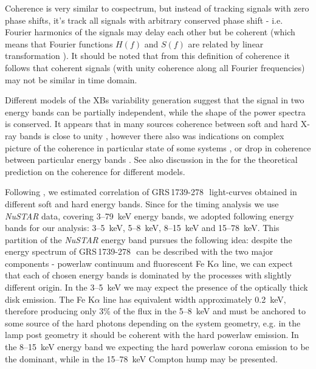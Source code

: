\documentclass[a4paper,fleqn,usenatbib]{mnras}
\def\grs{{GRS\,1739-278\,}}
\begin{document}
Coherence is very similar to cospectrum, but instead of tracking signals with zero phase shifts, it's track all signals with arbitrary conserved phase shift - i.e. Fourier harmonics of the signals may delay each other but be coherent (which means that Fourier functions $H(f)$ and $S(f)$ are related by linear transformation \citep{1997ApJ...474L..43V}).
It should be noted that from this definition of coherence it follows that coherent signals (with unity coherence along all Fourier frequencies) may not be similar in time domain. 

Different models of the XBs variability generation suggest that the signal in two energy bands can be partially independent, while the shape of the power spectra is conserved.
It appears that in many sources coherence between soft and hard X-ray bands is close to unity \citep{1999ApJ...517..355N, 1999ApJ...514..939W}, however there also was indications on complex picture of the coherence in particular state of some systems \citep{2003ApJ...584L..23J}, or drop in coherence between particular energy bands \citep[e.g. in GX 339--4][]{1997ApJ...474L..43V}.
See also discussion in the \citep{1997ApJ...474L..43V} for the theoretical prediction on the coherence for different models.


Following \citep{1997ApJ...474L..43V}, we estimated correlation of \grs\ light-curves obtained in different soft and hard energy bands. 
Since for the timing analysis we use {\it NuSTAR} data, covering 3--79~keV energy bands, we adopted following energy bands for our analysis: 3--5~keV, 5--8~keV, 8--15~keV and 15--78~keV.
This partition of the {\it NuSTAR} energy band pursues the following idea: despite the energy spectrum of \grs\ can be described with the two major components - powerlaw continuum and fluorescent Fe K$\alpha$ line, we can expect that each of chosen energy bands is dominated by the processes with slightly different origin. 
In the 3--5~keV we may expect the presence of the optically thick disk emission. 
The Fe K$\alpha$ line has equivalent width approximately 0.2~keV, therefore producing only 3\% of the flux in the 5--8~keV and must be anchored to some source of the hard photons depending on the system geometry, e.g. in the lamp post geometry it should be coherent with the hard powerlaw emission. 
In the 8--15~keV energy band we expecting the hard powerlaw corona emission to be the dominant, while in the 15--78~keV Compton hump may be presented.
\end{document}
